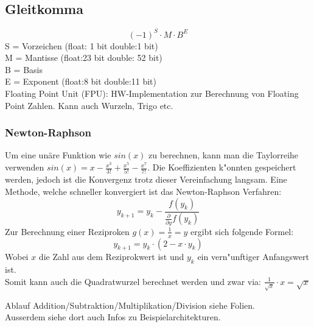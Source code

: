 \subsection{Gleitkomma}
\begin{equation}
(-1)^S\cdot M \cdot B^E
\end{equation}
S = Vorzeichen (float: 1 bit double:1 bit)\\
M = Mantisse (float:23 bit double: 52 bit)\\
B = Basis \\
E = Exponent (float:8 bit double:11 bit)\\

Floating Point Unit (FPU): HW-Implementation zur Berechnung von Floating Point Zahlen. Kann auch Wurzeln, Trigo etc.\\

\subsubsection{Newton-Raphson}
Um eine unäre Funktion wie $sin(x)$ zu berechnen, kann man die Taylorreihe verwenden $sin(x) = x - \frac{x^3}{3!} + \frac{x^5}{5!} - \frac{x^7}{7!}$. Die Koeffizienten k"onnten gespeichert werden, jedoch ist die Konvergenz trotz dieser Vereinfachung langsam. 
Eine Methode, welche schneller konvergiert ist das Newton-Raphson Verfahren: 
\begin{equation}
y_{k+1} = y_k - \frac{f(y_k)}{\frac{\partial}{\partial y}f(y_k)}
\end{equation}
Zur Berechnung einer Reziproken $g(x)=\frac{1}{x}=y$ ergibt sich folgende Formel: 
\begin{equation}
y_{k+1} = y_k\cdot (2-x\cdot y_k)
\end{equation}
Wobei $x$ die Zahl aus dem Reziprokwert ist und $y_k$ ein vern"unftiger Anfangswert ist. \\

Somit kann auch die Quadratwurzel berechnet werden und zwar via: $\frac{1}{\sqrt{x}} \cdot x = \sqrt{x}$

Ablauf Addition/Subtraktion/Multiplikation/Division siehe Folien.\\
Ausserdem siehe dort auch Infos zu Beispielarchitekturen.

